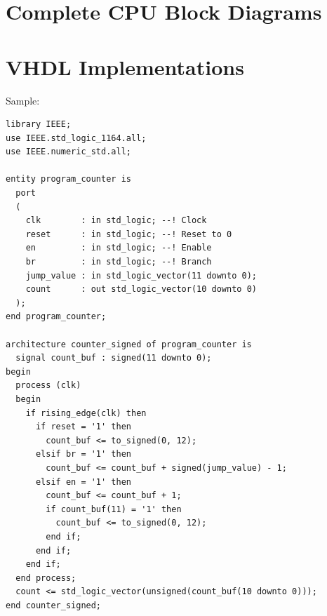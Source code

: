 \documentclass[lettersize,journal]{IEEEtran}
\begin{document}
{\appendices
\section*{Complete CPU Block Diagrams}
\color{red}{TBD}\color{black}

\section*{VHDL Implementations}
Sample:
\color{red}{TBD due to current overfull issues...}\color{black}\\
\begin{Verbatim}[breaklines]
    library IEEE;
use IEEE.std_logic_1164.all;
use IEEE.numeric_std.all;

entity program_counter is
  port
  (
    clk        : in std_logic; --! Clock
    reset      : in std_logic; --! Reset to 0
    en         : in std_logic; --! Enable
    br         : in std_logic; --! Branch
    jump_value : in std_logic_vector(11 downto 0);
    count      : out std_logic_vector(10 downto 0)
  );
end program_counter;

architecture counter_signed of program_counter is
  signal count_buf : signed(11 downto 0);
begin
  process (clk)
  begin
    if rising_edge(clk) then
      if reset = '1' then
        count_buf <= to_signed(0, 12);
      elsif br = '1' then
        count_buf <= count_buf + signed(jump_value) - 1;
      elsif en = '1' then
        count_buf <= count_buf + 1;
        if count_buf(11) = '1' then
          count_buf <= to_signed(0, 12);
        end if;
      end if;
    end if;
  end process;
  count <= std_logic_vector(unsigned(count_buf(10 downto 0)));
end counter_signed;
\end{Verbatim}
}

\nocite{*}

\end{document}
